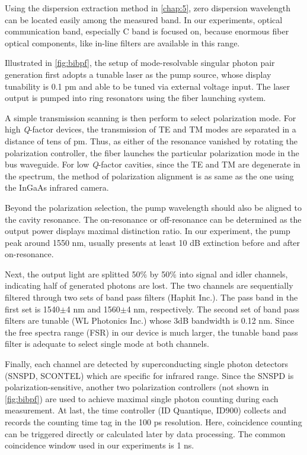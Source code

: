 Using the dispersion extraction method in \autoref{chap:5}, zero dispersion wavelength can be located easily among the measured band. In our experiments, optical communication band, especially C band is focused on, because enormous fiber optical components, like in-line filters are available in this range.

Illustrated in \autoref{fig:bibpf}, the setup of mode-resolvable singular photon pair generation first adopts a tunable laser as the pump source, whose display tunability is 0.1 pm and able to be tuned via external voltage input. The laser output is pumped into ring resonators using the fiber launching system.%

A simple transmission scanning is then perform to select polarization mode.
For high \textit{Q}-factor devices, the transmission of TE and TM modes are separated in a distance of tens of pm. Thus, as either of the resonance vanished by rotating the polarization controller, the fiber launches the particular polarization mode in the bus waveguide. For low \textit{Q}-factor cavities, since the TE and TM are degenerate in the spectrum, the method of polarization alignment is as same as the one using the InGaAs infrared camera.

Beyond the polarization selection, the pump wavelength should also be aligned to the cavity resonance. The on-resonance or off-resonance can be determined as the output power displays maximal distinction ratio. In our experiment, the pump peak around 1550 nm, usually presents at least 10 dB extinction before and after on-resonance.

Next, the output light are splitted 50\si{\percent} by 50\si{\percent} into signal and idler channels, indicating half of generated photons are lost. The two channels are sequentially filtered through two sets of band pass filters (Haphit Inc.). The pass band in the first set is 1540$\pm$4 nm and 1560$\pm$4 nm, respectively. The second set of band pass filters are tunable (WL Photonics Inc.) whose 3dB bandwidth is 0.12 nm. Since the free spectra range (FSR) in our device is much larger, the tunable band pass filter is adequate to select single mode at both channels.

Finally, each channel are detected by superconducting single photon detectors (SNSPD, SCONTEL) which are specific for infrared range. Since the SNSPD is polarization-sensitive, another two polarization controllers (not shown in \autoref{fig:bibpf}) are used to achieve maximal single photon counting during each measurement. At last, the time controller (ID Quantique, ID900) collects and records the counting time tag in the 100 ps resolution. Here, coincidence counting can be triggered directly or calculated later by data processing. The common coincidence window used in our experiments is 1 ns.

